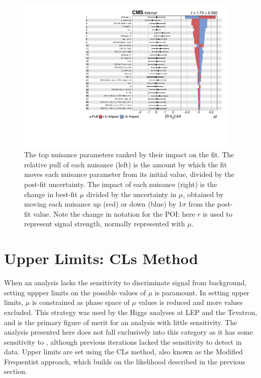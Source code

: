 \begin{figure}[htb]
        \centering 
        \includegraphics[width=0.95\textwidth]{ch10_figs/impacts_ttH_13TeV_top30.pdf}
        \caption[Nuisance parameter impacts]{The top nuisance parameters ranked by their impact on the fit. The relative pull of each nuisance (left) is the amount by which the fit moves each nuisance
          parameter from its initial value, divided by the post-fit uncertainty. The impact of each nuisance (right) is the change in best-fit $\mu$ divided by the uncertainty in $\mu$, obtained by
          moving each nuisance up (red) or down (blue) by 1$\sigma$ from the post-fit value. Note the change in notation for the POI: here $r$ is used to represent signal strength, normally represented with $\mu$.}
        \label{fig:impacts}
\end{figure}

\section{Upper Limits: CLs Method}
\label{sec:limit}
When an analysis lacks the sensitivity to discriminate signal from background, setting uppper limits on the possible values of $\mu$ is paramount. In setting upper
limits, $\mu$ is constrained as phase space of $\mu$ values is reduced and more values excluded. This strategy was used by the Higgs analyses at LEP and the Tevatron, and is the primary figure of merit
for an analysis with little sensitivity.
The \tth analysis presented here does not fall exclusively into this category as it has some sensitivity to \tth, although previous iterations lacked the sensitivity
to detect \tth in data. Upper limits are set using the CLs method, also known as the
Modified Frequentist approach, which builds on the likelihood described in the previous section. 

